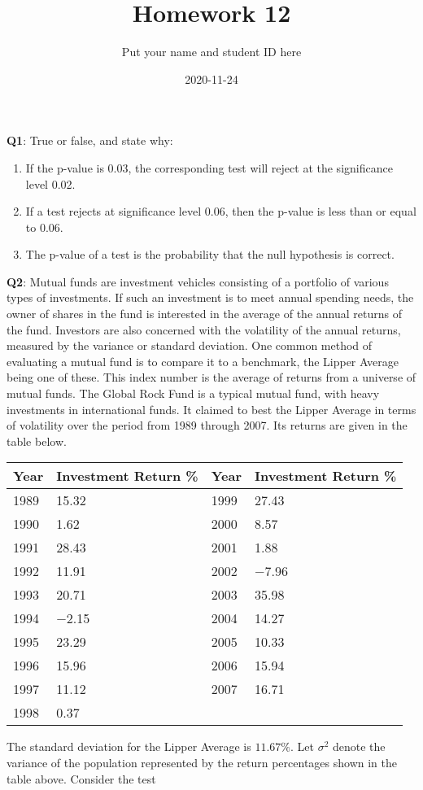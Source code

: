 \documentclass[]{article}
\title{Homework 12}
\author{Put your name and student ID here}
\date{2020-11-24}
\begin{document}
\maketitle

\textbf{Q1}: True or false, and state why:

\begin{enumerate}
\def\labelenumi{\arabic{enumi}.}
\item
  If the p-value is 0.03, the corresponding test will reject at the
  significance level 0.02.
\item
  If a test rejects at significance level 0.06, then the p-value is less
  than or equal to 0.06.
\item
  The p-value of a test is the probability that the null hypothesis is
  correct.
\end{enumerate}

\textbf{Q2}: Mutual funds are investment vehicles consisting of a
portfolio of various types of investments. If such an investment is to
meet annual spending needs, the owner of shares in the fund is
interested in the average of the annual returns of the fund. Investors
are also concerned with the volatility of the annual returns, measured
by the variance or standard deviation. One common method of evaluating a
mutual fund is to compare it to a benchmark, the Lipper Average being
one of these. This index number is the average of returns from a
universe of mutual funds. The Global Rock Fund is a typical mutual fund,
with heavy investments in international funds. It claimed to best the
Lipper Average in terms of volatility over the period from 1989 through
2007. Its returns are given in the table below.

\begin{longtable}[]{@{}llll@{}}
\toprule
Year & Investment Return \% & Year & Investment Return \%\tabularnewline
\midrule
\endhead
1989 & 15.32 & 1999 & 27.43\tabularnewline
1990 & 1.62 & 2000 & 8.57\tabularnewline
1991 & 28.43 & 2001 & 1.88\tabularnewline
1992 & 11.91 & 2002 & −7.96\tabularnewline
1993 & 20.71 & 2003 & 35.98\tabularnewline
1994 & −2.15 & 2004 & 14.27\tabularnewline
1995 & 23.29 & 2005 & 10.33\tabularnewline
1996 & 15.96 & 2006 & 15.94\tabularnewline
1997 & 11.12 & 2007 & 16.71\tabularnewline
1998 & 0.37 & &\tabularnewline
\bottomrule
\end{longtable}

The standard deviation for the Lipper Average is \(11.67\%\). Let
\(\sigma^2\) denote the variance of the population represented by the
return percentages shown in the table above. Consider the test
\end{document}

